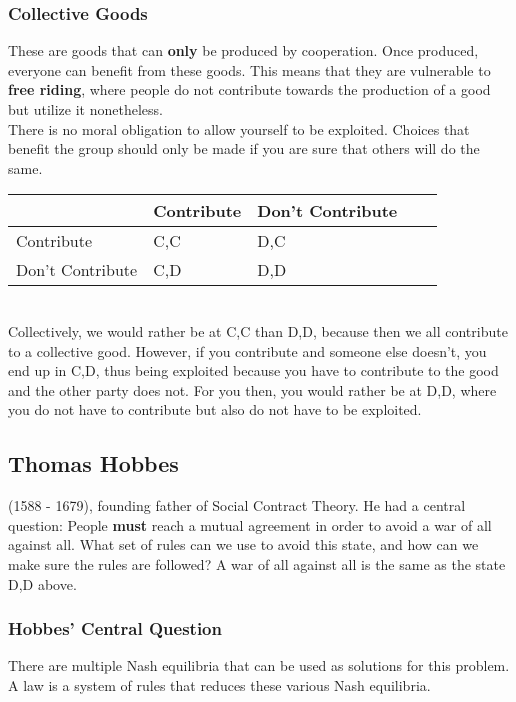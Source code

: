 \documentclass{article}
\begin{document}
        \subsubsection{Collective Goods}
        These are goods that can \textbf{only} be produced by cooperation. Once produced, everyone can benefit from these goods. This means that they are vulnerable to \textbf{free riding}, where people do not contribute towards the production of a good but utilize it nonetheless.
        \\There is no moral obligation to allow yourself to be exploited. Choices that benefit the group should only be made if you are sure that others will do the same.
        \begin{table}[h!]
        \begin{tabular}{l|llll}
                              & Contribute      & Don't Contribute  \\ \hline
        Contribute            & C,C             & D,C               \\
        Don't Contribute      & C,D             & D,D                                 
        \end{tabular}
        \end{table}
        \\Collectively, we would rather be at C,C than D,D, because then we all contribute to a collective good. However, if you contribute and someone else doesn't, you end up in C,D, thus being exploited because you have to contribute to the good and the other party does not. For you then, you would rather be at D,D, where you do not have to contribute but also do not have to be exploited.
        
        \subsection{Thomas Hobbes}
        (1588 - 1679), founding father of Social Contract Theory. He had a central question: People \textbf{must} reach a mutual agreement in order to avoid a war of all against all. What set of rules can we use to avoid this state, and how can we make sure the rules are followed? A war of all against all is the same as the state D,D above.
        \subsubsection{Hobbes' Central Question}
        There are multiple Nash equilibria that can be used as solutions for this problem. A law is a system of rules that reduces these various Nash equilibria.
        
\end{document}
